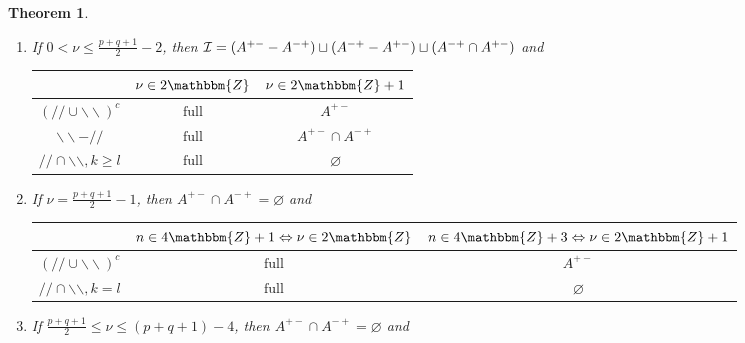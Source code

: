 \documentclass[12pt]{msjproc} %
\newcommand{\assign}{:=}
\newcommand{\tmop}[1]{\ensuremath{\operatorname{#1}}}
\newtheorem{theorem}{Theorem}
\theoremstyle{definition}
\theoremstyle{exampstyle} \newtheorem{examp}[theorem]{Theorem}
\begin{document}
\begin{versiona}
\begin{theorem}
\begin{enumerate}
\begin{enumerate}
\begin{eqnarray}
        & A^{\noplus \noplus + -} \assign \{ (a, b) \in \mathcal{I} | a - b
        \leqslant - \nu + q - 1 \} &  \nonumber
      \end{eqnarray}
      \item If $0 < \nu \leqslant \frac{p + q + 1}{2} - 2$, then $\mathcal{I}=
      (A^{  + -} - A^{- +}) \sqcup (A^{- +} - A^{+ -}) \sqcup
      (A^{- +} \cap A^{ + -})$ and
      \begin{center}
        \begin{tabular}{|c|c|c|}
          \hline
          & $\nu \in 2\mathbbm{Z}$ & $\nu \in 2\mathbbm{Z}+ 1$\\
          \hline
          $(/ / \cup \backslash\backslash)^c$ & $\tmop{full}$ & $A^{+ -}$\\
          \hline
          $\backslash\backslash - / /$ & $\tmop{full}$ & $A^{+ -} \cap A^{-
          +}$\\
          \hline
          $/ / \cap \backslash\backslash, k \geqslant l$ & $\tmop{full}$ &
          $\varnothing$\\
          \hline
        \end{tabular}
      \end{center}
      \item If $\nu = \frac{p + q + 1}{2} - 1$, then $A^{+ -} \cap A^{- +} =
      \varnothing$ and
      \begin{center}
        \begin{tabular}{|c|c|c|}
          \hline
          & $n \in 4\mathbbm{Z}+ 1 \Leftrightarrow \nu \in 2\mathbbm{Z}$ & $n
          \in 4\mathbbm{Z}+ 3 \Leftrightarrow \nu \in 2\mathbbm{Z}+ 1$\\
          \hline
          $(/ / \cup \backslash\backslash)^c$ & $\tmop{full}$ & $A^{+ -}$\\
          \hline
          $/ / \cap \backslash\backslash, k = l$ & $\tmop{full}$ &
          $\varnothing$\\
          \hline
        \end{tabular}
      \end{center}
      \item If $\frac{p + q + 1}{2} \leqslant \nu \leqslant (p + q + 1) - 4$,
      then $A^{+ -} \cap A^{- +} = \varnothing$ and
      

\end{enumerate}
\end{enumerate}
\end{theorem}
\end{versiona}
\end{document}
